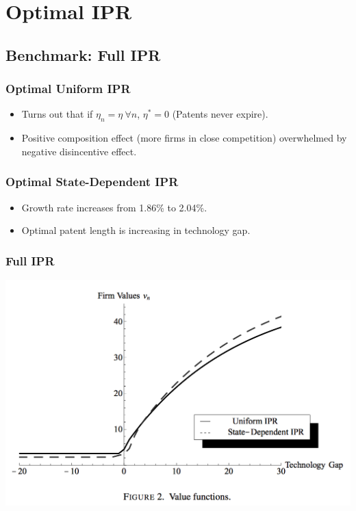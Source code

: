 \documentclass{beamer}
\begin{document}
\section{Optimal IPR}
\label{sec:optimal_ipr}
\subsection{Benchmark: Full IPR}
\label{sub:benchmark_full_ipr}
\begin{frame}[t]\frametitle{Optimal Uniform IPR} 
  \begin{itemize}
    \item<+-> Turns out that if $\eta_n = \eta \ \forall n$, $\eta^* = 0$ (Patents never expire).
    \item<+-> Positive composition effect (more firms in close competition) overwhelmed by negative disincentive effect.
  \end{itemize}
\end{frame}

\begin{frame}[t]\frametitle{Optimal State-Dependent IPR} 
  \begin{itemize}
    \item<+-> Growth rate increases from 1.86\% to 2.04\%.
    \item<+-> Optimal patent length is increasing in technology gap. 
  \end{itemize}
\end{frame}

\begin{frame}[t]\frametitle{Full IPR} 
  \begin{center}
    \includegraphics[scale=.31]{full_ipr_value.png}
    \label{fig:full_ipr_value}
  \end{center}
\end{frame}
\end{document}
